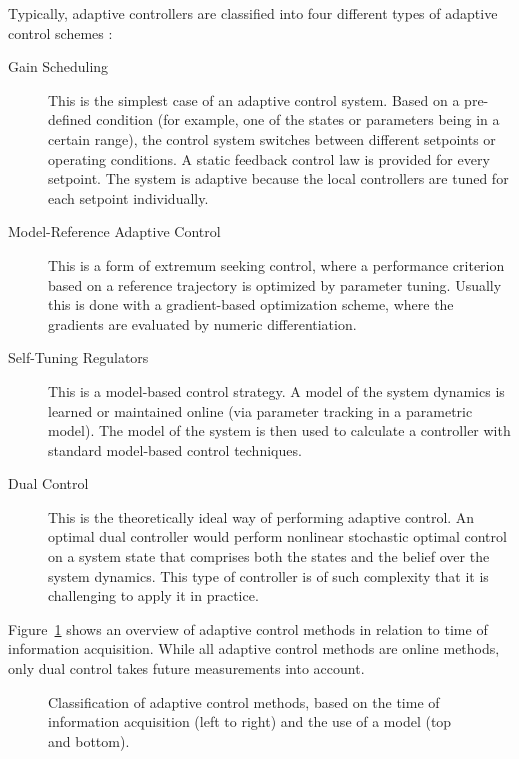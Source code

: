 Typically, adaptive controllers are classified into four different types of
adaptive control schemes
%
%
:
\begin{description}
  \item[Gain Scheduling]
  This is the simplest case of an adaptive control system. Based on a
  pre-defined condition (for example, one of the states or parameters being in a
  certain  range), the control system switches between different setpoints or
  operating  conditions. A static feedback control law is provided for every
  setpoint. The  system is adaptive because the local controllers are tuned for
  each setpoint
  individually.~\cite{Leith.Leithead:2000:Survey}
  \item[Model-Reference Adaptive Control] This is a form of extremum seeking
  control, where a performance criterion based on a reference trajectory is
  optimized by parameter tuning. Usually this is done with a gradient-based
  optimization scheme, where the gradients are evaluated by numeric
  differentiation.~\cite{Landau:1974:Survey}
  \item[Self-Tuning Regulators] This is a model-based control strategy. A model
  of the system dynamics is learned or maintained online (\eg via parameter
  tracking in a parametric model). The model of the system is then used to
  calculate a controller with standard model-based control
  techniques.~\cite{Astrom.Wittenmark:1973:Self}
  \item[Dual Control\footnotemark] This is the theoretically ideal way of performing
  adaptive control. An optimal dual controller would perform nonlinear
  stochastic optimal control on a system state that comprises both the states
  and the belief over the system dynamics. This type of controller is of such
  complexity that it is challenging to apply it in
  practice.~\cite{Wittenmark:1995:Adaptive}
\end{description}

Figure~\ref{fig:methods-classification} shows an overview of adaptive control
methods in relation to time of information acquisition.  While all adaptive
control methods are online methods, only dual control takes future measurements
into account.

\begin{figure}%
  \centering
  \caption[Classification of adaptive control methods.]{Classification
of adaptive control methods, based on the time of information acquisition
(left to right) and the use of a model (top and bottom).}
  \label{fig:methods-classification}
\end{figure}

